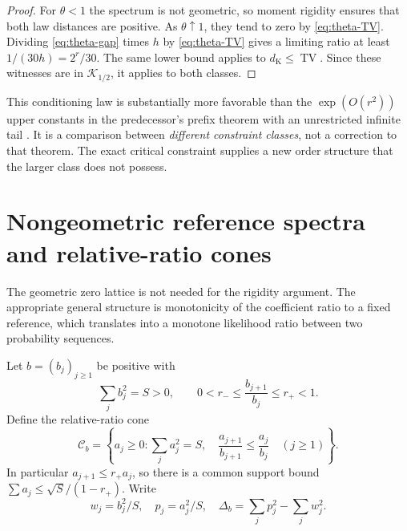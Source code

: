 \documentclass[11pt,a4paper]{article}
\numberwithin{equation}{section}
\theoremstyle{definition}
\theoremstyle{remark}
\DeclareMathOperator{\TV}{TV}
\newcommand{\C}{\mathcal C}
\newcommand{\K}{\mathcal K}
\newcommand{\dK}{d_{\mathrm K}}
\begin{document}
\begin{proof}
For $\theta<1$ the spectrum is not geometric, so moment rigidity ensures
that both law distances are positive. As $\theta\uparrow1$, they tend to
zero by \eqref{eq:theta-TV}. Dividing \eqref{eq:theta-gap} times $h$ by
\eqref{eq:theta-TV} gives a limiting ratio at least $1/(30h)=2^r/30$.
The same lower bound applies to $\dK\le\TV$. Since these witnesses are
in $\K_{1/2}$, it applies to both classes.
\end{proof}

This conditioning law is substantially more favorable than the
$\exp(O(r^2))$ upper constants in the predecessor's prefix theorem with an
unrestricted infinite tail \cite{anchored}. It is a comparison between
\emph{different constraint classes}, not a correction to that theorem.
The exact critical constraint supplies a new order structure that the larger
class does not possess.

\section{Nongeometric reference spectra and relative-ratio cones}
\label{sec:profiles}

The geometric zero lattice is not needed for the rigidity argument. The
appropriate general structure is monotonicity of the coefficient ratio to a
fixed reference, which translates into a monotone likelihood ratio between
two probability sequences.

Let $b=(b_j)_{j\ge1}$ be positive with
\begin{equation}
 \sum_jb_j^2=S>0,\qquad
 0<r_-\le\frac{b_{j+1}}{b_j}\le r_+<1.
 \label{eq:profile-ratios}
\end{equation}
Define the relative-ratio cone
\begin{equation}
 \C_b=\left\{a_j\ge0:\sum_ja_j^2=S,\quad
       \frac{a_{j+1}}{b_{j+1}}\le\frac{a_j}{b_j}\quad(j\ge1)\right\}.
 \label{eq:profile-class}
\end{equation}
In particular $a_{j+1}\le r_+a_j$, so there is a common support bound
$\sum a_j\le\sqrt S/(1-r_+)$. Write
\[
 w_j=b_j^2/S,\quad p_j=a_j^2/S,\quad
 \Delta_b=\sum_jp_j^2-\sum_jw_j^2.
\]
\end{document}
